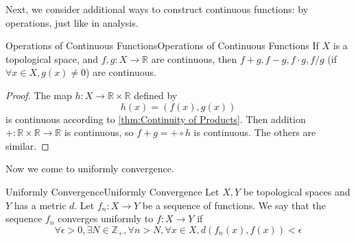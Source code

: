\documentclass[../main.tex]{subfiles}
\begin{document}
Next, we consider additional ways to construct continuous functions: by operations, just like in analysis.

\begin{theorem}{Operations of Continuous Functions}{Operations of Continuous Functions}
	If $X$ is a topological space, and $f,g: X \rightarrow \mathbb{R}$ are continuous, then $f+g, f-g, f \cdot g, f / g$ (if $\forall x\in X,g(x) \neq 0$) are continuous.
\end{theorem}
\begin{proof}
The map $h: X \rightarrow \mathbb{R} \times \mathbb{R}$ defined by
\begin{equation*}
h(x) = (f(x),g(x))
\end{equation*}
is continuous according to \ref{thm:Continuity of Products}. Then addition $+: \mathbb{R} \times \mathbb{R} \rightarrow \mathbb{R}$ is continuous, so $f+g = + \circ h$ is continuous. The others are similar.
\end{proof}

Now we come to uniformly convergence.

\begin{definition}{Uniformly Convergence}{Uniformly Convergence}
Let $X,Y$ be topological spaces and $Y$ has a metric $d$. Let $f_n: X \rightarrow Y$ be a sequence of functions. We say that the sequence $f_n$ converges uniformly to $f: X \rightarrow Y$ if
\begin{equation*}
\forall \epsilon>0, \exists N\in \mathbb{Z}_+, \forall n>N, \forall x\in X, d(f_n(x),f(x)) < \epsilon
\end{equation*}
\end{definition}
\end{document}
